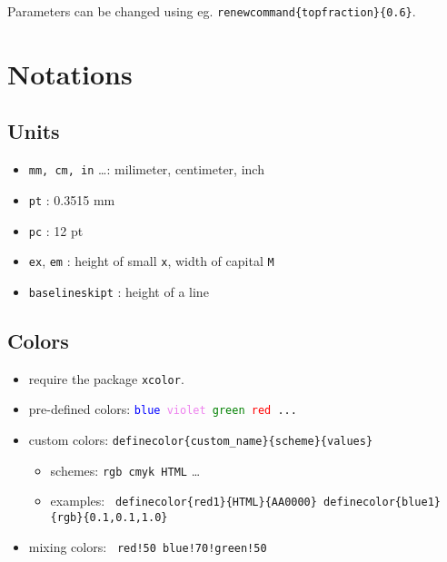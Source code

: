         Parameters can be changed using eg. \texttt{\bs renewcommand\{\bs topfraction\}\{0.6\}}.

\section{Notations}

    \subsection{Units}
        \begin{itemize}
            \item \texttt{mm, cm, in} \dots : milimeter, centimeter, inch
            \item \texttt{pt} : 0.3515 mm
            \item \texttt{pc} : 12 pt
            \item \texttt{ex}, \texttt{em} : height of small \texttt{x}, width of capital \texttt{M}
            \item \texttt{\bs baselineskipt} : height of a line
        \end{itemize}

    \subsection{Colors}
        \label{subsec:notations_colors}
        \begin{itemize}
            \item require the package \texttt{xcolor}.
            \item pre-defined colors: \texttt{\textcolor{blue}{blue} \textcolor{violet}{violet} \textcolor{green}{green} \textcolor{red}{red} ...}
            \item custom colors: \texttt{\bs definecolor\{custom\_name\}\{scheme\}\{values\} }
                \begin{itemize}
                    \item schemes: \texttt{rgb cmyk HTML} \dots
                     
                    \item examples: \texttt{ \textcolor{red1}{\bs definecolor\{red1\}\{HTML\}\{AA0000\}}
                        \textcolor{blue1}{\bs definecolor\{blue1\}\{rgb\}\{0.1,0.1,1.0\}} }
                \end{itemize}
            \item mixing colors: \texttt{ \textcolor{red!50}{red!50} \textcolor{blue!70!green!50}{blue!70!green!50} }
        \end{itemize}

